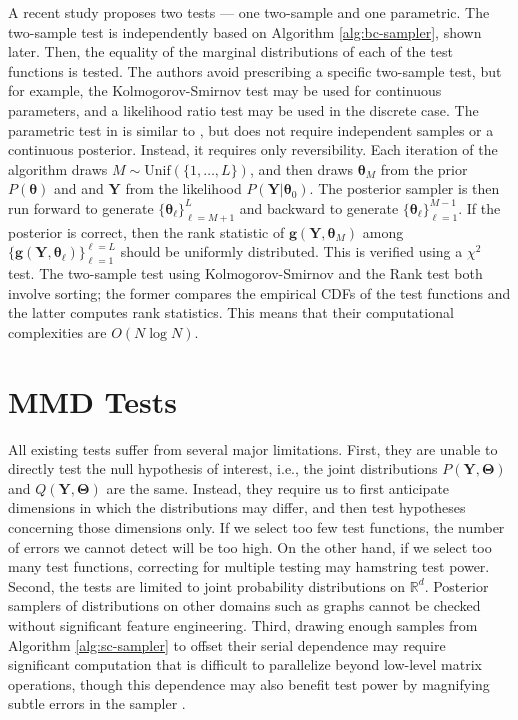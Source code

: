 \documentclass[a4paper,11pt]{article}
\begin{document}
A recent study \cite{gandy_unit_2020} proposes two tests --- one two-sample and one parametric. The two-sample test is independently based on Algorithm \ref{alg:bc-sampler}, shown later. Then, the equality of the marginal distributions of each of the test functions is tested. The authors avoid prescribing a specific two-sample test, but for example, the Kolmogorov-Smirnov test may be used for continuous parameters, and a likelihood ratio test may be used in the discrete case. 
The parametric test in \cite{gandy_unit_2020} is similar to \cite{talts_validating_2018}, but does not require independent samples or a continuous posterior. Instead, it requires only reversibility. Each iteration of the algorithm draws $M \sim \mathrm{Unif}(\{1, \ldots, L\})$, and then draws $\mathbf{\theta}_{M}$ from the prior $P(\mathbf{\theta})$ and and $\mathbf{Y}$ from the likelihood $P(\mathbf{Y}|\mathbf{\theta}_{0})$.  The posterior sampler is then run forward to generate $\{\mathbf{\theta}_{\ell}\}_{\ell=M+1}^{L}$ and backward to generate $\{\mathbf{\theta}_{\ell}\}_{\ell=1}^{M-1}$. If the posterior is correct, then the rank statistic of $\mathbf{g}(\mathbf{Y},\mathbf{\theta}_{M})$ among $\{\mathbf{g}(\mathbf{Y},\mathbf{\theta}_{\ell})\}_{\ell=1}^{\ell=L}$ should be uniformly distributed. This is verified using a $\chi^{2}$ test. The two-sample test using Kolmogorov-Smirnov and the Rank test both involve sorting; the former compares the empirical CDFs of the test functions and the latter computes rank statistics. This means that their computational complexities are $O(N \log N)$.

\section{MMD Tests}
All existing tests suffer from several major limitations. First, they are unable to directly test the null hypothesis of interest, i.e., the joint distributions $P(\mathbf{Y}, \mathbf{\Theta})$ and $Q(\mathbf{Y}, \mathbf{\Theta})$ are the same. Instead, they require us to first anticipate dimensions in which the distributions may differ, and then test hypotheses concerning those dimensions only. If we select too few test functions, the number of errors we cannot detect will be too high. On the other hand, if we select too many test functions, correcting for multiple testing may hamstring test power. Second, the tests are limited to joint probability distributions on $\mathbb{R}^{d}$. Posterior samplers of distributions on other domains such as graphs cannot be checked without significant feature engineering. Third, drawing enough samples from Algorithm \ref{alg:sc-sampler} to offset their serial dependence may require significant computation that is difficult to parallelize beyond low-level matrix operations, though this dependence may also benefit test power by magnifying subtle errors in the sampler \cite{grosse_testing_2014}. 
\end{document}
